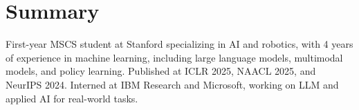 \section{Summary}
\small
\begin{minipage}{1\textwidth}
First-year MSCS student at Stanford specializing in AI and robotics, with 4 years of experience in machine learning, including large language models, multimodal models, and policy learning. Published at ICLR 2025, NAACL 2025, and NeurIPS 2024. Interned at IBM Research and Microsoft, working on LLM and applied AI for real-world tasks.
\end{minipage}
\vspace{-5pt}